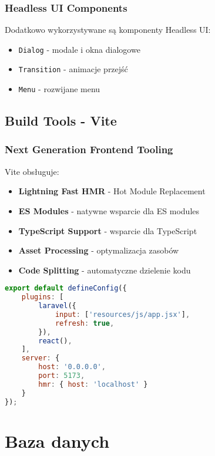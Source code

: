     \subsubsection{Headless UI Components}
    Dodatkowo wykorzystywane są komponenty Headless UI:
    \begin{itemize}
        \item \texttt{Dialog} - modale i okna dialogowe
        \item \texttt{Transition} - animacje przejść
        \item \texttt{Menu} - rozwijane menu
    \end{itemize}

    \subsection{Build Tools - Vite}

    \subsubsection{Next Generation Frontend Tooling}
    Vite obsługuje:

    \begin{itemize}
        \item \textbf{Lightning Fast HMR} - Hot Module Replacement
        \item \textbf{ES Modules} - natywne wsparcie dla ES modules
        \item \textbf{TypeScript Support} - wsparcie dla TypeScript
        \item \textbf{Asset Processing} - optymalizacja zasobów
        \item \textbf{Code Splitting} - automatyczne dzielenie kodu
    \end{itemize}

    \begin{lstlisting}[language=JavaScript, caption=Konfiguracja Vite]
export default defineConfig({
    plugins: [
        laravel({
            input: ['resources/js/app.jsx'],
            refresh: true,
        }),
        react(),
    ],
    server: {
        host: '0.0.0.0',
        port: 5173,
        hmr: { host: 'localhost' }
    }
});
    \end{lstlisting}

    \section{Baza danych}

